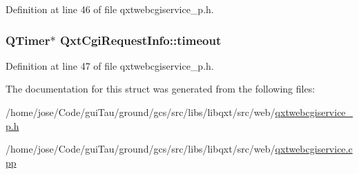 Definition at line 46 of file qxtwebcgiservice\-\_\-p.\-h.

\hypertarget{struct_qxt_cgi_request_info_a7d01adea3d8039ebd4767ff1acd4459b}{
\subsubsection[{timeout}]{\setlength{\rightskip}{0pt plus 5cm}Q\-Timer$\ast$ Qxt\-Cgi\-Request\-Info\-::timeout}}\label{struct_qxt_cgi_request_info_a7d01adea3d8039ebd4767ff1acd4459b}


Definition at line 47 of file qxtwebcgiservice\-\_\-p.\-h.



The documentation for this struct was generated from the following files\-:\begin{DoxyCompactItemize}
\item 
/home/jose/\-Code/gui\-Tau/ground/gcs/src/libs/libqxt/src/web/\hyperlink{qxtwebcgiservice__p_8h}{qxtwebcgiservice\-\_\-p.\-h}\item 
/home/jose/\-Code/gui\-Tau/ground/gcs/src/libs/libqxt/src/web/\hyperlink{qxtwebcgiservice_8cpp}{qxtwebcgiservice.\-cpp}\end{DoxyCompactItemize}
